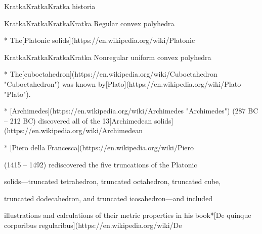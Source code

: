 


KratkaKratkaKratka historia

KratkaKratkaKratkaKratka Regular convex polyhedra

* The[Platonic solids](https://en.wikipedia.org/wiki/Platonic%

KratkaKratkaKratkaKratka Nonregular uniform convex polyhedra

* The[cuboctahedron](https://en.wikipedia.org/wiki/Cuboctahedron "Cuboctahedron") was known by[Plato](https://en.wikipedia.org/wiki/Plato "Plato").

* [Archimedes](https://en.wikipedia.org/wiki/Archimedes "Archimedes") (287 BC – 212 BC) discovered all of the 13[Archimedean solids](https://en.wikipedia.org/wiki/Archimedean%

* [Piero della Francesca](https://en.wikipedia.org/wiki/Piero%

(1415 – 1492) rediscovered the five truncations of the Platonic

solids—truncated tetrahedron, truncated octahedron, truncated cube,

truncated dodecahedron, and truncated icosahedron—and included

illustrations and calculations of their metric properties in his book*[De quinque corporibus regularibus](https://en.wikipedia.org/wiki/De%


